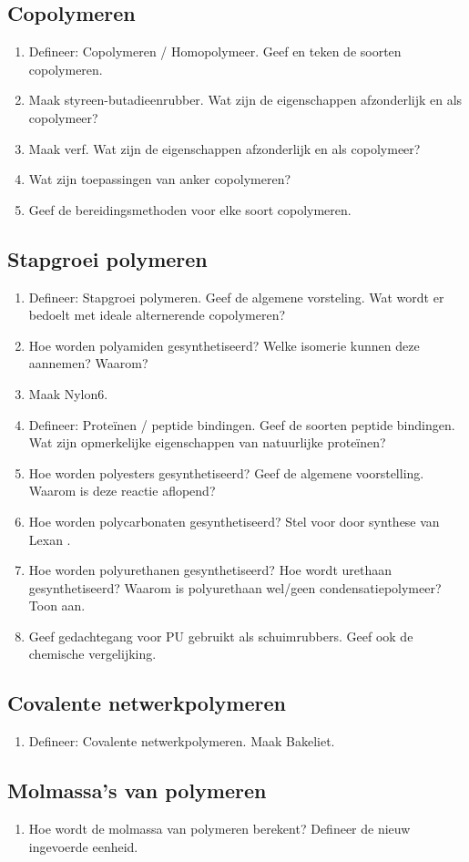 \documentclass[a4paper,12pt]{article}
\begin{document}
    \subsection*{Copolymeren}
    \begin{enumerate}
        \item Defineer: Copolymeren / Homopolymeer. Geef en teken de soorten copolymeren.
        \item Maak styreen-butadieenrubber. Wat zijn de eigenschappen afzonderlijk en als copolymeer?
        \item Maak verf. Wat zijn de eigenschappen afzonderlijk en als copolymeer?
        \item Wat zijn toepassingen van anker copolymeren?
        \item Geef de bereidingsmethoden voor elke soort copolymeren.
    \end{enumerate}
    \subsection*{Stapgroei polymeren}
    \begin{enumerate}
        \item Defineer: Stapgroei polymeren. Geef de algemene vorsteling. Wat wordt er bedoelt met ideale alternerende copolymeren?
        \item Hoe worden polyamiden gesynthetiseerd? Welke isomerie kunnen deze aannemen? Waarom?
        \item Maak Nylon6.
        \item Defineer: Proteïnen / peptide bindingen. Geef de soorten peptide bindingen. Wat zijn opmerkelijke eigenschappen van natuurlijke proteïnen?
        \item Hoe worden polyesters gesynthetiseerd? Geef de algemene voorstelling. Waarom is deze reactie aflopend?
        \item Hoe worden polycarbonaten gesynthetiseerd? Stel voor door synthese van Lexan \textregistered.
        \item Hoe worden polyurethanen gesynthetiseerd? Hoe wordt urethaan gesynthetiseerd? Waarom is polyurethaan wel/geen condensatiepolymeer? Toon aan.
        \item Geef gedachtegang voor PU gebruikt als schuimrubbers. Geef ook de chemische vergelijking.
    \end{enumerate}
    \subsection*{Covalente netwerkpolymeren}
    \begin{enumerate}
        \item Defineer: Covalente netwerkpolymeren. Maak Bakeliet.
    \end{enumerate}
    \subsection*{Molmassa's van polymeren}
    \begin{enumerate}
        \item Hoe wordt de molmassa van polymeren berekent? Defineer de nieuw ingevoerde eenheid.
    \end{enumerate}
\end{document}
